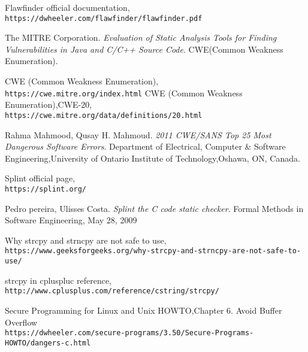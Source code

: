 \documentclass[a4paper,12pt]{article}
\begin{document}
\begin{thebibliography}{}

   Flawfinder official documentation,\\\texttt{https://dwheeler.com/flawfinder/flawfinder.pdf}

The MITRE Corporation.
\textit{Evaluation of Static Analysis Tools for Finding Vulnerabilities in Java and C/C++
Source Code}.
CWE(Common
Weakness Enumeration)\cite{CWE}.

  CWE (Common
Weakness Enumeration),\\\texttt{https://cwe.mitre.org/index.html}
  CWE (Common
Weakness Enumeration),CWE-20,\\\texttt{https://cwe.mitre.org/data/definitions/20.html}
  
Rahma Mahmood, Qusay H. Mahmoud.
\textit{2011 CWE/SANS Top 25 Most Dangerous Software Errors}.
Department of Electrical, Computer \& Software Engineering,University of Ontario Institute of Technology,Oshawa, ON, Canada.

 Splint official page,\\\texttt{https://splint.org/}    

Pedro pereira, Ulisses Costa.
\textit{Splint the C code static checker}.
Formal Methods in Software Engineering, May 28, 2009

Why strcpy and strncpy are not safe to use,\\\texttt{https://www.geeksforgeeks.org/why-strcpy-and-strncpy-are-not-safe-to-use/}


strcpy in cpluspluc reference,\\\texttt{http://www.cplusplus.com/reference/cstring/strcpy/}

Secure Programming for Linux and Unix HOWTO,Chapter 6. Avoid Buffer Overflow\\\texttt{https://dwheeler.com/secure-programs/3.50/Secure-Programs-HOWTO/dangers-c.html}

\end{thebibliography}
\end{document}
